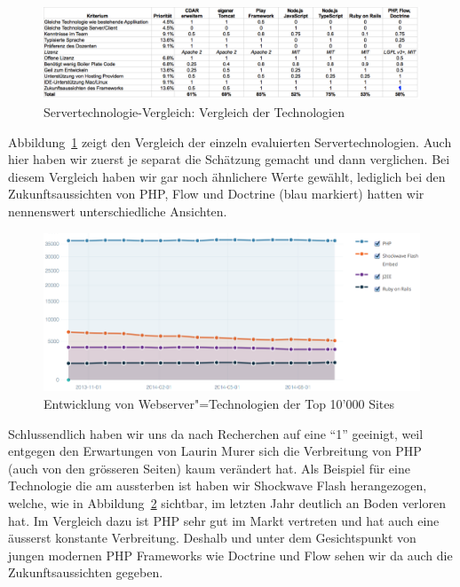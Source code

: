 			\begin{figure}[H]
				\begin{minipage}[b]{\linewidth}
					\includegraphics[width=\textwidth]{media/spreadsheets/ServertechnologieVergleichVergleichDerTechnologien.pdf}
					\centering
					\caption{Servertechnologie-Vergleich: Vergleich der Technologien}
					\label{fig:ServertechnologieVergleichVergleichDerTechnologien.pdf}
				\end{minipage}
			\end{figure}
			
			Abbildung~\ref{fig:ServertechnologieVergleichVergleichDerTechnologien.pdf} zeigt den Vergleich der einzeln evaluierten Servertechnologien.
			Auch hier haben wir zuerst je separat die Schätzung gemacht und dann verglichen.
			Bei diesem Vergleich haben wir gar noch ähnlichere Werte gewählt, lediglich bei den Zukunftsaussichten von PHP, Flow und Doctrine (blau markiert) hatten wir nennenswert unterschiedliche Ansichten.
			
			\begin{figure}
					\includegraphics[width=\textwidth]{media/img/EntwicklungVonWebserverTechnologien.png}
					\centering
					\caption{Entwicklung von Webserver"=Technologien der Top 10'000 Sites \cite{sharesOfWebtechnologies}}
					\label{fig:EntwicklungVonWebserverTechnologien}
			\end{figure}
			
			Schlussendlich haben wir uns da nach Recherchen auf eine "`1"' geeinigt, weil entgegen den Erwartungen von Laurin Murer sich die Verbreitung von PHP (auch von den grösseren Seiten) kaum verändert hat.
			Als Beispiel für eine Technologie die am aussterben ist haben wir Shockwave Flash herangezogen, welche, wie in Abbildung~\ref{fig:EntwicklungVonWebserverTechnologien} sichtbar, im letzten Jahr deutlich an Boden verloren hat.
			Im Vergleich dazu ist PHP sehr gut im Markt vertreten und hat auch eine äusserst konstante Verbreitung.
			Deshalb und unter dem Gesichtspunkt von jungen modernen PHP Frameworks wie Doctrine und Flow sehen wir da auch die Zukunftsaussichten gegeben.
			
